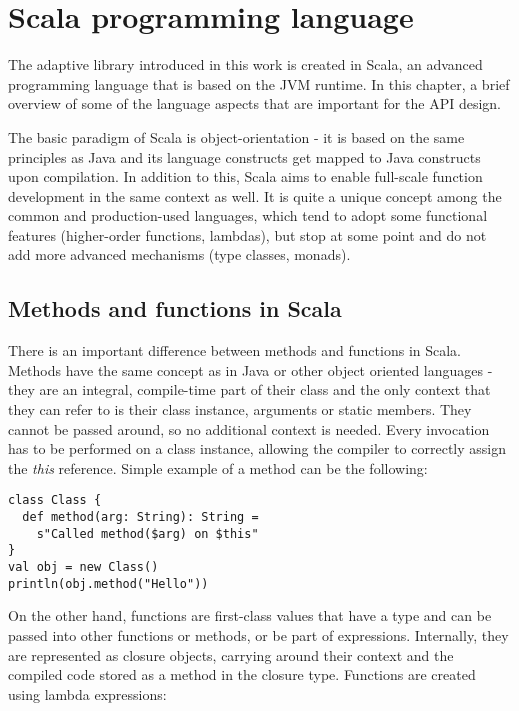 \chapter{Scala programming language}
\label{chap:scala}

The adaptive library introduced in this work is created in Scala, an advanced programming language that is based on the JVM runtime. In this chapter, a brief overview of some of the language aspects that are important for the API design.

The basic paradigm of Scala is object-orientation - it is based on the same principles as Java and its language constructs get mapped to Java constructs upon compilation. In addition to this, Scala aims to enable full-scale function development in the same context as well. It is quite a unique concept among the common and production-used languages, which tend to adopt some functional features (higher-order functions, lambdas), but stop at some point and do not add more advanced mechanisms (type classes, monads).

\section{Methods and functions in Scala}
\label{sec:metandfun}

There is an important difference between methods and functions in Scala. Methods have the same concept as in Java or other object oriented languages - they are an integral, compile-time part of their class and the only context that they can refer to is their class instance, arguments or static members. They cannot be passed around, so no additional context is needed. Every invocation has to be performed on a class instance, allowing the compiler to correctly assign the \textit{this} reference. Simple example of a method can be the following:

\lstset{style=Scala}
\begin{lstlisting}
class Class {
  def method(arg: String): String = 
    s"Called method($arg) on $this"
}
val obj = new Class()
println(obj.method("Hello"))
\end{lstlisting}

On the other hand, functions are first-class values that have a type and can be passed into other functions or methods, or be part of expressions. Internally, they are represented as closure objects, carrying around their context and the compiled code stored as a method in the closure type. Functions are created using lambda expressions:

